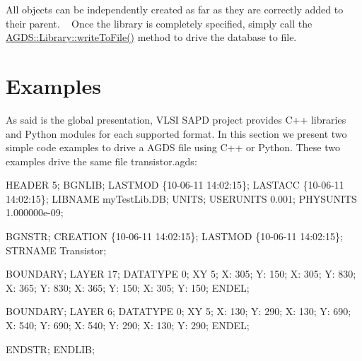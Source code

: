 All objects can be independently created as far as they are correctly added to their parent. ~\newline
Once the library is completely specified, simply call the \mbox{\hyperlink{class_a_g_d_s_1_1_library_a33b9d989b84857f46034085664ff3fa2}{A\+G\+D\+S\+::\+Library\+::write\+To\+File()}} method to drive the database to file.\hypertarget{agds_agdsExamples}{}\section{Examples}\label{agds_agdsExamples}
As said is the global presentation, V\+L\+SI S\+A\+PD project provides C++ libraries and Python modules for each supported format. In this section we present two simple code examples to drive a A\+G\+DS file using C++ or Python. These two examples drive the same file {\ttfamily transistor.\+agds\+:} 
\begin{DoxyCodeInclude}
HEADER 5;
BGNLIB;
  LASTMOD \{10-06-11  14:02:15\};
  LASTACC \{10-06-11  14:02:15\};
LIBNAME myTestLib.DB;
UNITS;
  USERUNITS 0.001;
  PHYSUNITS 1.000000e-09;

BGNSTR;
  CREATION \{10-06-11  14:02:15\};
  LASTMOD  \{10-06-11  14:02:15\};
STRNAME Transistor;

BOUNDARY;
LAYER 17;
DATATYPE 0;
XY 5;
  X: 305;   Y: 150;
  X: 305;   Y: 830;
  X: 365;   Y: 830;
  X: 365;   Y: 150;
  X: 305;   Y: 150;
ENDEL;

BOUNDARY;
LAYER 6;
DATATYPE 0;
XY 5;
  X: 130;   Y: 290;
  X: 130;   Y: 690;
  X: 540;   Y: 690;
  X: 540;   Y: 290;
  X: 130;   Y: 290;
ENDEL;

ENDSTR;
ENDLIB;
\end{DoxyCodeInclude}


